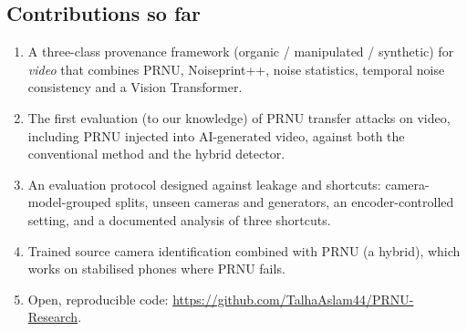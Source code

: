 \documentclass[11pt,a4paper]{article}
\begin{document}
\subsection{Contributions so far}
\begin{enumerate}
\item A three-class provenance framework (organic / manipulated / synthetic) for \emph{video} that combines PRNU, Noiseprint++,
      noise statistics, temporal noise consistency and a Vision Transformer.
\item The first evaluation (to our knowledge) of PRNU transfer attacks on video, including PRNU injected into
      AI-generated video, against both the conventional method and the hybrid detector.
\item An evaluation protocol designed against leakage and shortcuts: camera-model-grouped splits, unseen cameras and
      generators, an encoder-controlled setting, and a documented analysis of three shortcuts.
\item Trained source camera identification combined with PRNU (a hybrid), which works on stabilised phones where PRNU fails.
\item Open, reproducible code: \url{https://github.com/TalhaAslam44/PRNU-Research}.
\end{enumerate}

\end{document}
